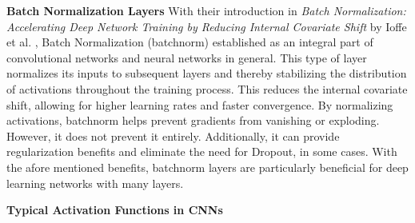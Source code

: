 \textbf{Batch Normalization Layers}\label{theoretical_classification_batchnorm_layers}
With their introduction in \textit{Batch Normalization: Accelerating Deep Network Training by Reducing Internal Covariate Shift} by Ioffe et al. \cite{ioffe2015batchnormalizationacceleratingdeep}, Batch Normalization (batchnorm) established as an integral part of convolutional networks and neural networks in general. This type of layer normalizes its inputs to subsequent layers and thereby stabilizing the distribution of activations throughout the training process. This reduces the internal covariate shift, allowing for higher learning rates and faster convergence. By normalizing activations, batchnorm helps prevent gradients from vanishing or exploding. However, it does not prevent it entirely. Additionally, it can provide regularization benefits and eliminate the need for Dropout, in some cases. With the afore mentioned benefits, batchnorm layers are particularly beneficial for deep learning networks with many layers.


\textbf{Typical Activation Functions in CNNs}

